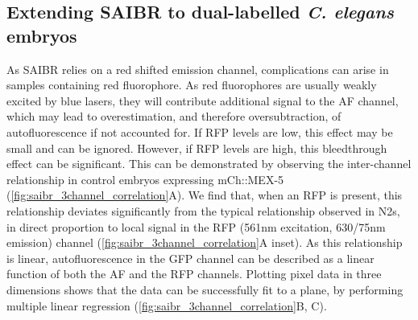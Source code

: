 \documentclass[12pt]{"report"}
\begin{document}
\subsection{Extending SAIBR to dual-labelled \textit{C. elegans} embryos}

As SAIBR relies on a red shifted emission channel, complications can arise in samples containing red fluorophore. As red fluorophores are usually weakly excited by blue lasers, they will contribute additional signal to the AF channel, which may lead to overestimation, and therefore oversubtraction, of autofluorescence if not accounted for. If RFP levels are low, this effect may be small and can be ignored. However, if RFP levels are high, this bleedthrough effect can be significant. This can be demonstrated by observing the inter-channel relationship in control embryos expressing mCh::MEX-5 (\cref{fig:saibr_3channel_correlation}A). We find that, when an RFP is present, this relationship deviates significantly from the typical relationship observed in N2s, in direct proportion to local signal in the RFP (561nm excitation, 630/75nm emission) channel (\cref{fig:saibr_3channel_correlation}A inset). As this relationship is linear, autofluorescence in the GFP channel can be described as a linear function of both the AF and the RFP channels. Plotting pixel data in three dimensions shows that the data can be successfully fit to a plane, by performing multiple linear regression (\cref{fig:saibr_3channel_correlation}B, C). \\
\end{document}
